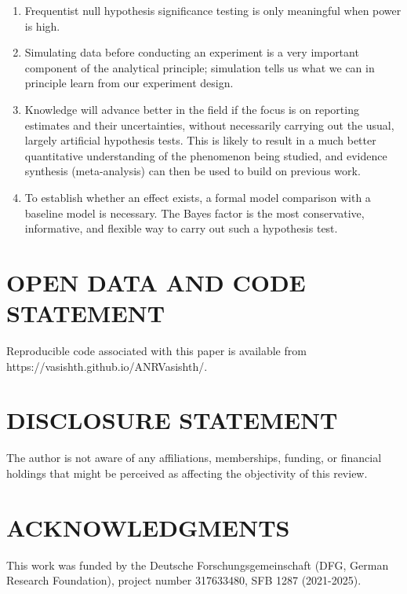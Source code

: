 \documentclass{ar-1col}\usepackage[]{graphicx}\usepackage[]{color}
\begin{document}
\begin{summary}
\begin{enumerate}
\item Frequentist null hypothesis significance testing is only meaningful when power is high.
\item Simulating data before conducting an experiment is a very important component of the analytical principle; simulation tells us what we can in principle learn from our experiment design.
\item Knowledge will advance better in the field if the focus is on reporting estimates and their uncertainties, without necessarily carrying out the usual, largely artificial hypothesis tests. This is likely to result in a much better quantitative understanding of the phenomenon being studied, and evidence synthesis (meta-analysis) can then be used to build on previous work.
\item To establish whether an effect exists,  a formal model comparison with a baseline model is necessary. The Bayes factor is the most conservative, informative, and flexible way to carry out such a hypothesis test.
\end{enumerate}
\end{summary}


\section{OPEN DATA AND CODE STATEMENT}

Reproducible code associated with this paper is available from  https://vasishth.github.io/ANRVasishth/.

\section*{DISCLOSURE STATEMENT}
The author is not aware of any affiliations, memberships, funding, or financial holdings that
might be perceived as affecting the objectivity of this review. 

\section*{ACKNOWLEDGMENTS}

This work was funded by the Deutsche Forschungsgemeinschaft (DFG, German Research Foundation), project number 317633480, SFB 1287 (2021-2025). 


 

\end{document}
